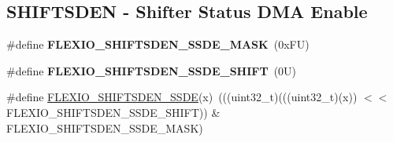 \subsection*{S\+H\+I\+F\+T\+S\+D\+EN -\/ Shifter Status D\+MA Enable}
\begin{DoxyCompactItemize}
\item 
\mbox{\label{group___f_l_e_x_i_o___register___masks_gae4ef41c89e904b74a5ceff07f10c6312}} 
\#define {\bfseries F\+L\+E\+X\+I\+O\+\_\+\+S\+H\+I\+F\+T\+S\+D\+E\+N\+\_\+\+S\+S\+D\+E\+\_\+\+M\+A\+SK}~(0x\+F\+U)
\item 
\mbox{\label{group___f_l_e_x_i_o___register___masks_ga90fdb580684ca585a5b9dceba67e9576}} 
\#define {\bfseries F\+L\+E\+X\+I\+O\+\_\+\+S\+H\+I\+F\+T\+S\+D\+E\+N\+\_\+\+S\+S\+D\+E\+\_\+\+S\+H\+I\+FT}~(0\+U)
\item 
\#define \mbox{\hyperlink{group___f_l_e_x_i_o___register___masks_ga3b16c58e90d2a9fe5e2a2bd12d4feb32}{F\+L\+E\+X\+I\+O\+\_\+\+S\+H\+I\+F\+T\+S\+D\+E\+N\+\_\+\+S\+S\+DE}}(x)~(((uint32\+\_\+t)(((uint32\+\_\+t)(x)) $<$$<$ F\+L\+E\+X\+I\+O\+\_\+\+S\+H\+I\+F\+T\+S\+D\+E\+N\+\_\+\+S\+S\+D\+E\+\_\+\+S\+H\+I\+FT)) \& F\+L\+E\+X\+I\+O\+\_\+\+S\+H\+I\+F\+T\+S\+D\+E\+N\+\_\+\+S\+S\+D\+E\+\_\+\+M\+A\+SK)
\end{DoxyCompactItemize}
